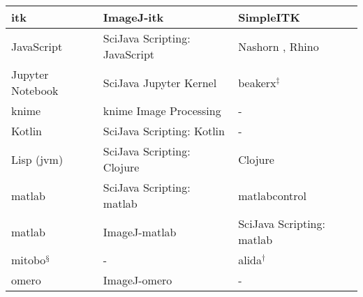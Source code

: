 \documentclass{bmcart}
\begin{document}
\begin{backmatter}
\begin{table}[h!]
\begin{tabular}{| l | l | l |}
      \acrshort{itk}                              \cite{itk}             & ImageJ-\acrshort{itk}                 \cite{imagej_itk}              & SimpleITK                                           \cite{simpleitk}       \\ \hline
      JavaScript                                  \cite{javascript}      & SciJava Scripting: JavaScript         \cite{scripting_javascript}    & Nashorn \cite{nashorn}, Rhino                       \cite{rhino}           \\ \hline
      Jupyter Notebook                            \cite{jupyter}         & SciJava Jupyter Kernel                \cite{scijava_jupyter_kernel}  & \acrshort{beakerx}$^\ddagger$                       \cite{beakerx}         \\ \hline
      \acrshort{knime}                            \cite{knime}           & \acrshort{knime} Image Processing     \cite{knip}                    & -                                                                          \\ \hline
      Kotlin                                      \cite{kotlin}          & SciJava Scripting: Kotlin             \cite{scripting_kotlin}        & -                                                                          \\ \hline
      Lisp (\acrshort{jvm})                       \cite{lisp}            & SciJava Scripting: Clojure            \cite{scripting_clojure}       & Clojure                                             \cite{clojure}         \\ \hline
      \acrshort{matlab}                           \cite{matlab}          & SciJava Scripting: \acrshort{matlab}  \cite{scripting_matlab}        & matlabcontrol                                       \cite{matlabcontrol}   \\ \hline
      \acrshort{matlab}                                                  & ImageJ-\acrshort{matlab}              \cite{imagej_matlab}           & SciJava Scripting: \acrshort{matlab}                \cite{matlabcontrol}   \\ \hline
      \acrshort{mitobo}$^\mathsection$            \cite{mitobo}          & -                                                                    & \acrshort{alida}$^\dagger$                          \cite{alida}           \\ \hline
      \acrshort{omero}                            \cite{omero}           & ImageJ-\acrshort{omero}               \cite{imagej_omero}            & -                                                                          \\ \hline

\end{tabular}
\end{table}
\end{backmatter}
\end{document}
